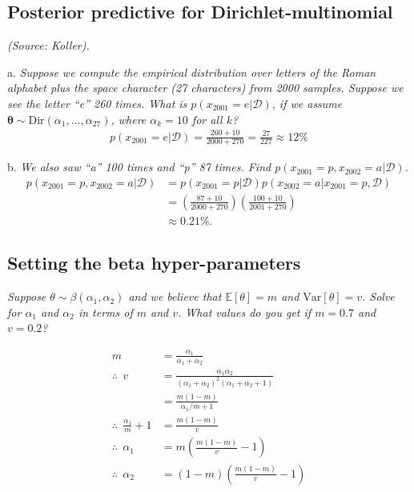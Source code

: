 \subsection{Posterior predictive for Dirichlet-multinomial}
\textit{(Source: Koller).}

a. \textit{Suppose we compute the empirical distribution over letters of the Roman alphabet plus the space character (27 characters) from 2000 samples. Suppose we see the letter ``e'' 260 times. What is $p(x_{2001}=e|\mathcal{D})$, if we assume $\bm\theta\sim\text{Dir}(\alpha_1,\dots,\alpha_{27})$, where $\alpha_k=10$ for all $k$?}
\begin{align*}
p(x_{2001}=e|\mathcal{D}) = \frac{260+10}{2000+270} = \frac{27}{227} \approx 12\%
\end{align*}

b. \textit{We also saw ``a'' 100 times and ``p'' 87 times. Find $p(x_{2001}=p,x_{2002}=a|\mathcal{D})$.}
\begin{align*}
p(x_{2001}=p,x_{2002}=a|\mathcal{D}) &= p(x_{2001}=p|\mathcal{D})p(x_{2002}=a|x_{2001}=p,\mathcal{D})\\
&= \left(\frac{87+10}{2000+270}\right) \left(\frac{100+10}{2001+270}\right)\\
&\approx 0.21\%.
\end{align*}

\subsection{Setting the beta hyper-parameters}
\textit{Suppose $\theta\sim\beta(\alpha_1,\alpha_2)$ and we believe that $\mathbb{E}[\theta]=m$ and $\text{Var}[\theta]=v$. Solve for $\alpha_1$ and $\alpha_2$ in terms of $m$ and $v$. What values do you get if $m=0.7$ and $v=0.2$?}
                                                                                                                                                                                                                                                                                                       
\begin{align*}
m &= \frac{\alpha_1}{\alpha_1+\alpha_2}\\
\therefore\ \ v &= \frac{\alpha_1\alpha_2}{(\alpha_1+\alpha_2)^2(\alpha_1+\alpha_2+1)}\\
&= \frac{m(1-m)}{\alpha_1/m+1}\\
\therefore\ \ \frac{\alpha_1}{m}+1 &= \frac{m(1-m)}{v}\\
\therefore\ \ \alpha_1 &= m\left(\frac{m(1-m)}{v}-1\right)\\
\therefore\ \ \alpha_2 &= (1-m)\left(\frac{m(1-m)}{v}-1\right)
\end{align*}

